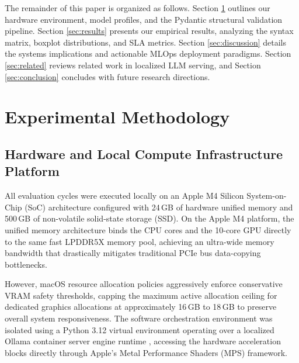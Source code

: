 \documentclass[11pt,journal,compsoc,onecolumn]{IEEEtran}
\begin{document}
The remainder of this paper is organized as follows. Section \ref{sec:methodology} outlines our hardware environment, model profiles, and the Pydantic structural validation pipeline. Section \ref{sec:results} presents our empirical results, analyzing the syntax matrix, boxplot distributions, and SLA metrics. Section \ref{sec:discussion} details the systems implications and actionable MLOps deployment paradigms. Section \ref{sec:related} reviews related work in localized LLM serving, and Section \ref{sec:conclusion} concludes with future research directions.

\section{Experimental Methodology}
\label{sec:methodology}

\subsection{Hardware and Local Compute Infrastructure Platform}
All evaluation cycles were executed locally on an Apple M4 Silicon System-on-Chip (SoC) architecture configured with 24\,GB of hardware unified memory and 500\,GB of non-volatile solid-state storage (SSD). On the Apple M4 platform, the unified memory architecture binds the CPU cores and the 10-core GPU directly to the same fast LPDDR5X memory pool, achieving an ultra-wide memory bandwidth that drastically mitigates traditional PCIe bus data-copying bottlenecks. 

However, macOS resource allocation policies aggressively enforce conservative VRAM safety thresholds, capping the maximum active allocation ceiling for dedicated graphics allocations at approximately 16\,GB to 18\,GB to preserve overall system responsiveness. The software orchestration environment was isolated using a Python 3.12 virtual environment operating over a localized Ollama container server engine runtime \cite{ollama2024}, accessing the hardware acceleration blocks directly through Apple's Metal Performance Shaders (MPS) framework.
\end{document}

